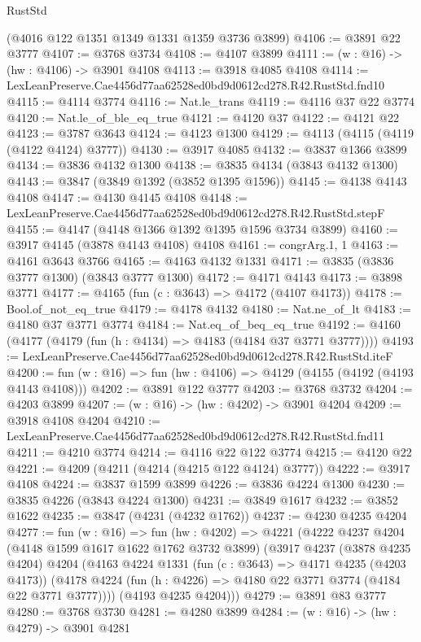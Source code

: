 \begin{lexlean}{RustStd}
\begin{coremodule}
    (@4016 @122 @1351 @1349 @1331 @1359 @3736 @3899)
@4106 := @3891 @22 @3777
@4107 := @3768 @3734
@4108 := @4107 @3899
@4111 := (w : @16) -> (hw : @4106) -> @3901 @4108
@4113 := @3918 @4085 @4108
@4114 := LexLeanPreserve.Cae4456d77aa62528ed0bd9d0612cd278.R42.RustStd.fnd10
@4115 := @4114 @3774
@4116 := Nat.le_trans
@4119 := @4116 @37 @22 @3774
@4120 := Nat.le_of_ble_eq_true
@4121 := @4120 @37
@4122 := @4121 @22
@4123 := @3787 @3643
@4124 := @4123 @1300
@4129 := @4113 (@4115 (@4119 (@4122 @4124) @3777))
@4130 := @3917 @4085
@4132 := @3837 @1366 @3899
@4134 := @3836 @4132 @1300
@4138 := @3835 @4134 (@3843 @4132 @1300)
@4143 := @3847 (@3849 @1392 (@3852 @1395 @1596))
@4145 := @4138 @4143 @4108
@4147 := @4130 @4145 @4108
@4148 := LexLeanPreserve.Cae4456d77aa62528ed0bd9d0612cd278.R42.RustStd.stepF
@4155 := @4147 (@4148 @1366 @1392 @1395 @1596 @3734 @3899)
@4160 := @3917 @4145 (@3878 @4143 @4108) @4108
@4161 := congrArg.{1, 1}
@4163 := @4161 @3643 @3766
@4165 := @4163 @4132 @1331
@4171 := @3835 (@3836 @3777 @1300) (@3843 @3777 @1300)
@4172 := @4171 @4143
@4173 := @3898 @3771
@4177 := @4165 (fun (c : @3643) => @4172 (@4107 @4173))
@4178 := Bool.of_not_eq_true
@4179 := @4178 @4132
@4180 := Nat.ne_of_lt
@4183 := @4180 @37 @3771 @3774
@4184 := Nat.eq_of_beq_eq_true
@4192 := @4160 (@4177 (@4179 (fun (h : @4134) => @4183 (@4184 @37 @3771 @3777))))
@4193 := LexLeanPreserve.Cae4456d77aa62528ed0bd9d0612cd278.R42.RustStd.iteF
@4200 := fun (w : @16) => fun (hw : @4106) => @4129 (@4155 (@4192 (@4193 @4143 @4108)))
@4202 := @3891 @122 @3777
@4203 := @3768 @3732
@4204 := @4203 @3899
@4207 := (w : @16) -> (hw : @4202) -> @3901 @4204
@4209 := @3918 @4108 @4204
@4210 := LexLeanPreserve.Cae4456d77aa62528ed0bd9d0612cd278.R42.RustStd.fnd11
@4211 := @4210 @3774
@4214 := @4116 @22 @122 @3774
@4215 := @4120 @22
@4221 := @4209 (@4211 (@4214 (@4215 @122 @4124) @3777))
@4222 := @3917 @4108
@4224 := @3837 @1599 @3899
@4226 := @3836 @4224 @1300
@4230 := @3835 @4226 (@3843 @4224 @1300)
@4231 := @3849 @1617
@4232 := @3852 @1622
@4235 := @3847 (@4231 (@4232 @1762))
@4237 := @4230 @4235 @4204
@4277 := fun (w : @16) =>
  fun (hw : @4202) =>
  @4221
    (@4222
      @4237
      @4204
      (@4148 @1599 @1617 @1622 @1762 @3732 @3899)
      (@3917
        @4237
        (@3878 @4235 @4204)
        @4204
        (@4163
          @4224
          @1331
          (fun (c : @3643) => @4171 @4235 (@4203 @4173))
          (@4178 @4224 (fun (h : @4226) => @4180 @22 @3771 @3774 (@4184 @22 @3771 @3777))))
        (@4193 @4235 @4204)))
@4279 := @3891 @83 @3777
@4280 := @3768 @3730
@4281 := @4280 @3899
@4284 := (w : @16) -> (hw : @4279) -> @3901 @4281

\end{coremodule}
\end{lexlean}
